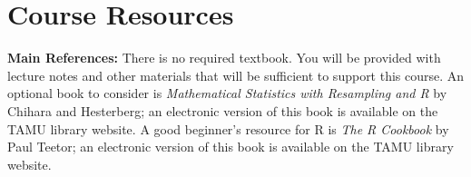 \documentclass[11pt, a4paper]{article}
\begin{document}

\section{Course Resources}

\noindent\textbf{Main References:} %
There is no required textbook. You will be provided with lecture notes and other materials that will be
sufficient to support this course. An optional book to consider is \textit{Mathematical Statistics with Resampling and
R} by Chihara and Hesterberg; an electronic version of this book is available on the TAMU library website. A good beginner's resource for R is \textit{The
R Cookbook} by Paul Teetor; an electronic version of this book is available on the TAMU library website.
\end{document}
